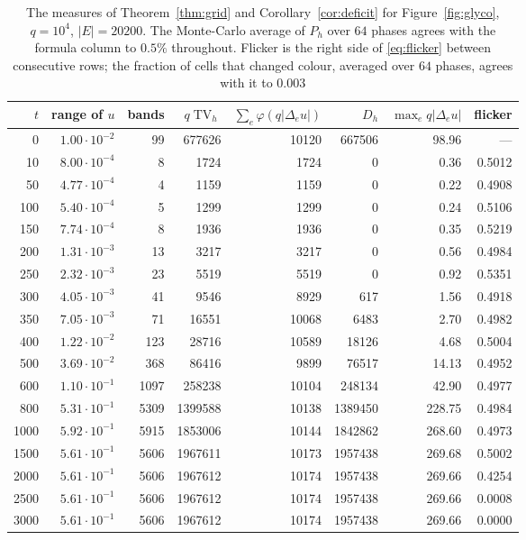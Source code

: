 \documentclass[11pt,a4paper]{article}
\theoremstyle{definition}
\theoremstyle{remark}
\newcommand{\TV}{\operatorname{TV}}
\begin{document}
\begin{table}[ht]
\centering
\small
\begin{tabular}{@{}rrrrrrrr@{}}
\toprule
$t$ & range of $u$ & bands & $q\TV_h$ & $\sum_e\varphi(q|\Delta_eu|)$ & $D_h$ & $\max_eq|\Delta_eu|$ & flicker \\
\midrule
0 & $1.00\cdot10^{-2}$ & 99 & 677626 & 10120 & 667506 & 98.96 & --- \\
10 & $8.00\cdot10^{-4}$ & 8 & 1724 & 1724 & 0 & 0.36 & 0.5012 \\
50 & $4.77\cdot10^{-4}$ & 4 & 1159 & 1159 & 0 & 0.22 & 0.4908 \\
100 & $5.40\cdot10^{-4}$ & 5 & 1299 & 1299 & 0 & 0.24 & 0.5106 \\
150 & $7.74\cdot10^{-4}$ & 8 & 1936 & 1936 & 0 & 0.35 & 0.5219 \\
200 & $1.31\cdot10^{-3}$ & 13 & 3217 & 3217 & 0 & 0.56 & 0.4984 \\
250 & $2.32\cdot10^{-3}$ & 23 & 5519 & 5519 & 0 & 0.92 & 0.5351 \\
300 & $4.05\cdot10^{-3}$ & 41 & 9546 & 8929 & 617 & 1.56 & 0.4918 \\
350 & $7.05\cdot10^{-3}$ & 71 & 16551 & 10068 & 6483 & 2.70 & 0.4982 \\
400 & $1.22\cdot10^{-2}$ & 123 & 28716 & 10589 & 18126 & 4.68 & 0.5004 \\
500 & $3.69\cdot10^{-2}$ & 368 & 86416 & 9899 & 76517 & 14.13 & 0.4952 \\
600 & $1.10\cdot10^{-1}$ & 1097 & 258238 & 10104 & 248134 & 42.90 & 0.4977 \\
800 & $5.31\cdot10^{-1}$ & 5309 & 1399588 & 10138 & 1389450 & 228.75 & 0.4984 \\
1000 & $5.92\cdot10^{-1}$ & 5915 & 1853006 & 10144 & 1842862 & 268.60 & 0.4973 \\
1500 & $5.61\cdot10^{-1}$ & 5606 & 1967611 & 10173 & 1957438 & 269.68 & 0.5002 \\
2000 & $5.61\cdot10^{-1}$ & 5606 & 1967612 & 10174 & 1957438 & 269.66 & 0.4254 \\
2500 & $5.61\cdot10^{-1}$ & 5606 & 1967612 & 10174 & 1957438 & 269.66 & 0.0008 \\
3000 & $5.61\cdot10^{-1}$ & 5606 & 1967612 & 10174 & 1957438 & 269.66 & 0.0000 \\
\bottomrule
\end{tabular}
\caption{The measures of Theorem~\ref{thm:grid} and
Corollary~\ref{cor:deficit} for Figure~\ref{fig:glyco}, $q=10^4$,
$|E|=20200$. The Monte-Carlo average of $P_h$ over $64$ phases agrees
with the formula column to $0.5\%$ throughout. Flicker is the right side
of \eqref{eq:flicker} between consecutive rows; the fraction of cells
that changed colour, averaged over $64$ phases, agrees with it to
$0.003$}
\label{tab:glyco}
\end{table}
\end{document}
